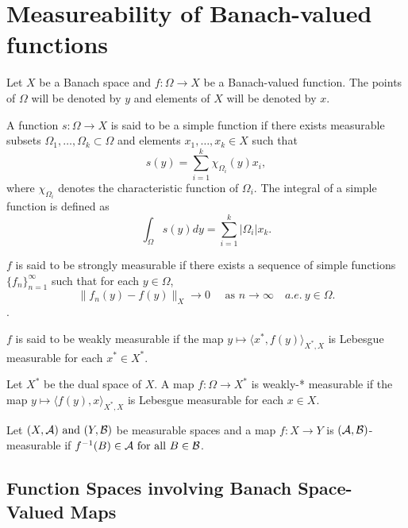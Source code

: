\section{Measureability of Banach-valued functions}
Let $X$ be a Banach space and $f:\Omega \to X$ be a Banach-valued function. The points of $\Omega$ will be denoted by $y$ and elements of $X$ will be denoted by $x$.

\begin{defn}
    A function $s : \Omega \to X$ is said to be a simple function if there exists measurable subsets $\Omega_1, \dots, \Omega_k \subset \Omega$ and elements $x_1, \dots, x_k \in X$ such that 
    $$ s(y) = \sum_{i=1}^{k} \chi_{\Omega_i}(y) x_i,$$
    where $\chi_{\Omega_i}$ denotes the characteristic function of $\Omega_i$. The integral of a simple function is defined as 
    $$ \int_\Omega s(y) dy = \sum_{i=1}^{k}|\Omega_i|x_k.$$
\end{defn}

\begin{defn}
    $f$ is said to be strongly measurable if there exists a sequence of simple functions $\{f_n\}_{n=1}^{\infty}$ such that for each $y \in \Omega$, $$\|f_n(y) - f(y)\|_{X} \to 0 \quad \text{ as } n \to \infty \quad a.e.\ y \in \Omega.$$.
\end{defn}

\begin{defn}
    $f$ is said to be weakly measurable if the map $y \mapsto \langle x^*, f(y) \rangle_{X^*, X}$ is Lebesgue measurable for each $x^* \in X^*$.
\end{defn}
\begin{defn}
    Let $X^*$ be the dual space of $X$. A map $f:\Omega \to X^*$ is weakly-* measurable if the map $y \mapsto \langle f(y), x\rangle_{X^*, X} $ is Lebesgue measurable for each $x \in X$.
\end{defn}
\begin{rem}
    Let $(X, {\cal A}) \text{ and } (Y, {\cal B})$ be measurable spaces and a map $f:X \to Y$ is $({\cal A, B})$-measurable if $f^{-1}(B) \in {\cal A} \text{ for all } B \in {\cal B}$. 
\end{rem}

\subsection{Function Spaces involving Banach Space-Valued Maps}

